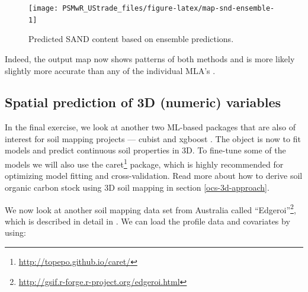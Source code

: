 \documentclass[graybox,natbib,nospthms,UStrade]{svmono}
\newenvironment{Shaded}{\begin{snugshade}}{\end{snugshade}}
\newcommand{\ErrorTok}[1]{\textcolor[rgb]{0.14,0.14,0.14}{\textbf{#1}}}
\newcommand{\KeywordTok}[1]{\textcolor[rgb]{0.27,0.27,0.27}{\textbf{#1}}}
\newcommand{\NormalTok}[1]{#1}
\newcommand{\OperatorTok}[1]{\textcolor[rgb]{0.43,0.43,0.43}{\textbf{#1}}}
\newcommand{\StringTok}[1]{\textcolor[rgb]{0.5,0.5,0.5}{#1}}
\renewcommand{\href}[2]{#2 (\url{#1})}
\renewcommand{\href}[2]{#2\footnote{\url{#1}}}
\begin{document}
\begin{figure}[H]

{\centering \texttt{[image: PSMwR\_UStrade\_files/figure-latex/map-snd-ensemble-1]} 

}

\caption{Predicted SAND content based on ensemble predictions.}\label{fig:map-snd-ensemble}
\end{figure}

Indeed, the output map now shows patterns of both methods and is more likely slightly more accurate than any of the individual MLA's \citep{krogh1996learning}.

\hypertarget{prediction-3D}{%
\subsection{Spatial prediction of 3D (numeric) variables}\label{prediction-3D}}

In the final exercise, we look at another two ML-based packages that are also of interest for soil mapping projects --- cubist \citep{kuhn2012cubist, kuhn2013applied} and xgboost \citep{2016arXiv160302754C}. The object is now to fit models and predict continuous soil properties in 3D. To fine-tune some of the models we will also use the \href{http://topepo.github.io/caret/}{caret} package, which is highly recommended for optimizing model fitting and cross-validation. Read more about how to derive soil organic carbon stock using 3D soil mapping in section \ref{ocs-3d-approach}.

We now look at another soil mapping data set from Australia called \href{http://gsif.r-forge.r-project.org/edgeroi.html}{``Edgeroi''}, which is described in detail in \citet{Malone2009Geoderma}. We can load the profile data and covariates by using:

\begin{Shaded}
\end{Shaded}
\end{document}
